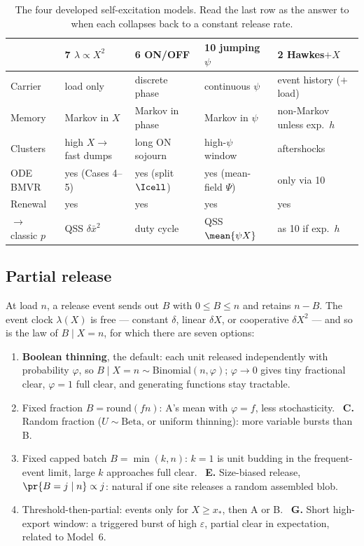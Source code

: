 \begin{table}[htbp]
\centering
\renewcommand{\arraystretch}{1.1}
\small
\begin{tabular}{@{}>{\raggedright\arraybackslash}p{}>{\raggedright\arraybackslash}p{}>{\raggedright\arraybackslash}p{}>{\raggedright\arraybackslash}p{}>{\raggedright\arraybackslash}p{}@{}}
\toprule
 & \textbf{7} $\lambda\propto X^2$ & \textbf{6} ON/OFF & \textbf{10} jumping $\psi$ & \textbf{2} Hawkes$+X$ \\
\midrule
Carrier & load only & discrete phase & continuous $\psi$ & event history ($+$load) \\
Memory & Markov in $X$ & Markov in phase & Markov in $\psi$ & non-Markov unless exp.\ $h$ \\
Clusters & high $X\to$ fast dumps & long ON sojourn & high-$\psi$ window & aftershocks \\
ODE BMVR & yes (Cases 4--5) & yes (split $\Icell$) & yes (mean-field $\Psi$) & only via 10 \\
Renewal & yes & yes & yes & yes \\
$\to$ classic $p$ & QSS $\delta\bar x^2$ & duty cycle & QSS $\mean{\psi X}$ & as 10 if exp.\ $h$ \\
\bottomrule
\end{tabular}
\caption{The four developed self-excitation models. Read the last row as
the answer to when each collapses back to a constant release rate.}
\label{p:tab:fourmodels}
\end{table}

\subsection{Partial release}

At load $n$, a release event sends out $B$ with $0\le B\le n$ and retains
$n-B$. The event clock $\lambda(X)$ is free --- constant $\delta$, linear
$\delta X$, or cooperative $\delta X^2$ --- and so is the law of $B\mid X=n$,
for which there are seven options:
\begin{enumerate}
\item[A.] \textbf{Boolean thinning}, the default: each unit released
independently with probability $\varphi$, so
$B\mid X=n\sim\mathrm{Binomial}(n,\varphi)$; $\varphi\to0$ gives tiny
fractional clear, $\varphi=1$ full clear, and generating functions stay
tractable.
\item[B.] Fixed fraction $B=\mathrm{round}(fn)$: A's mean with $\varphi=f$,
less stochasticity. \ \textbf{C.} Random fraction ($U\sim\mathrm{Beta}$, or
uniform thinning): more variable bursts than B.
\item[D.] Fixed capped batch $B=\min(k,n)$: $k=1$ is unit budding in the
frequent-event limit, large $k$ approaches full clear. \ \textbf{E.}
Size-biased release, $\pr{B=j\mid n}\propto j$: natural if one site releases
a random assembled blob.
\item[F.] Threshold-then-partial: events only for $X\ge x_*$, then A or B.
\ \textbf{G.} Short high-export window: a triggered burst of high
$\varepsilon$, partial clear in expectation, related to Model~6.
\end{enumerate}

